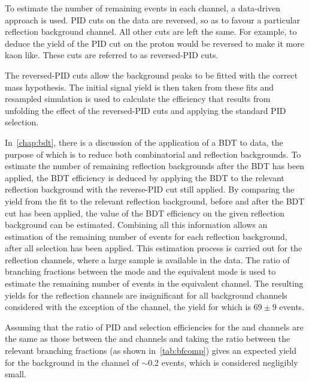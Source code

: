 To estimate the number of remaining events in each channel, a data-driven approach is used. PID cuts on the data are reversed, so as to favour a particular reflection background channel. All other cuts are left the same. For example, to deduce the yield of \Bd\to\Kp\pim\mup\mun the PID cut on the proton would be reversed to make it more kaon like. These cuts are referred to as reversed-PID cuts.

The reversed-PID cuts allow the background peaks to be fitted with the correct mass hypothesis. The initial signal yield is then taken from these fits and resampled simulation is used to calculate the efficiency that results from unfolding the effect of the reversed-PID cuts and applying the standard PID selection.

In~\autoref{chap:bdt}, there is a discussion of the application of a BDT to data, the purpose of which is to reduce both combinatorial and reflection backgrounds. To estimate the number of remaining reflection backgrounds after the BDT has been applied, the BDT efficiency is deduced by applying the BDT to the relevant reflection background with the reverse-PID cut still applied. By comparing the yield from the fit to the relevant reflection background, before and after the BDT cut has been applied, the value of the BDT efficiency on the given reflection background can be estimated. Combining all this information allows an estimation of the remaining number of events for each reflection background, after all selection has been applied. This estimation process is carried out for the \jpsi reflection channels, where a large sample is available in the data. The ratio of branching fractions between the \jpsi mode and the equivalent \mumu mode is used to estimate the remaining number of events in the equivalent \mumu channel.
The resulting yields for the \jpsi reflection channels are insignificant for all background channels considered with the exception of the \BdToKpi\jpsi channel, the yield for which is $69\pm9$ events. %

Assuming that the ratio of PID and selection efficiencies for the \BdToKpi\jpsi and \Bd\to\Kp\pim\mup\mun channels are the same as those between the \Lbpijpsi and \Lbpi channels and taking the ratio between the relevant branching fractions (as shown in~\autoref{tab:bfcomp}) gives an expected yield for the \BdToKpi\mumu background in the \Lbpi channel of $\sim$0.2 events, which is considered negligibly small. 

